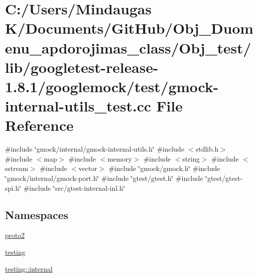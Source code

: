 \hypertarget{_obj__test_2lib_2googletest-release-1_88_81_2googlemock_2test_2gmock-internal-utils__test_8cc}{}\section{C\+:/\+Users/\+Mindaugas K/\+Documents/\+Git\+Hub/\+Obj\+\_\+\+Duomenu\+\_\+apdorojimas\+\_\+class/\+Obj\+\_\+test/lib/googletest-\/release-\/1.8.1/googlemock/test/gmock-\/internal-\/utils\+\_\+test.cc File Reference}
\label{_obj__test_2lib_2googletest-release-1_88_81_2googlemock_2test_2gmock-internal-utils__test_8cc}
{\ttfamily \#include \char`\"{}gmock/internal/gmock-\/internal-\/utils.\+h\char`\"{}}\newline
{\ttfamily \#include $<$stdlib.\+h$>$}\newline
{\ttfamily \#include $<$map$>$}\newline
{\ttfamily \#include $<$memory$>$}\newline
{\ttfamily \#include $<$string$>$}\newline
{\ttfamily \#include $<$sstream$>$}\newline
{\ttfamily \#include $<$vector$>$}\newline
{\ttfamily \#include \char`\"{}gmock/gmock.\+h\char`\"{}}\newline
{\ttfamily \#include \char`\"{}gmock/internal/gmock-\/port.\+h\char`\"{}}\newline
{\ttfamily \#include \char`\"{}gtest/gtest.\+h\char`\"{}}\newline
{\ttfamily \#include \char`\"{}gtest/gtest-\/spi.\+h\char`\"{}}\newline
{\ttfamily \#include \char`\"{}src/gtest-\/internal-\/inl.\+h\char`\"{}}\newline
\subsection*{Namespaces}
\begin{DoxyCompactItemize}
\item 
 \mbox{\hyperlink{namespaceproto2}{proto2}}
\item 
 \mbox{\hyperlink{namespacetesting}{testing}}
\item 
 \mbox{\hyperlink{namespacetesting_1_1internal}{testing\+::internal}}
\end{DoxyCompactItemize}
